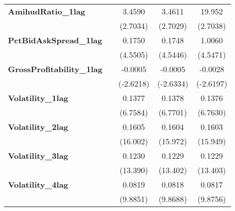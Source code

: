 {\begin{center}
\begin{longtable}{lcccc}
\textbf{AmihudRatio\_1lag}                 &                    &             3.4590            &             3.4611             &         19.952         \\
\textbf{ }                                 &                    &            (2.7034)           &            (2.7029)            &        (2.7038)        \\
\textbf{PctBidAskSpread\_1lag}             &                    &             0.1750            &             0.1748             &         1.0060         \\
\textbf{ }                                 &                    &            (4.5505)           &            (4.5446)            &        (4.5471)        \\
\textbf{GrossProfitability\_1lag}          &                    &            -0.0005            &            -0.0005             &        -0.0028         \\
\textbf{ }                                 &                    &           (-2.6218)           &           (-2.6334)            &       (-2.6197)        \\
\textbf{Volatility\_1lag}                  &                    &             0.1377            &             0.1378             &         0.1376         \\
\textbf{ }                                 &                    &            (6.7584)           &            (6.7701)            &        (6.7630)        \\
\pagebreak
\textbf{Volatility\_2lag}                  &                    &             0.1605            &             0.1604             &         0.1603         \\
\textbf{ }                                 &                    &            (16.002)           &            (15.972)            &        (15.949)        \\
\textbf{Volatility\_3lag}                  &                    &             0.1230            &             0.1229             &         0.1229         \\
\textbf{ }                                 &                    &            (13.390)           &            (13.402)            &        (13.403)        \\
\textbf{Volatility\_4lag}                  &                    &             0.0819            &             0.0818             &         0.0817         \\
\textbf{ }                                 &                    &            (9.8851)           &            (9.8688)            &        (9.8756)        \\

\end{longtable}
\end{center}}
